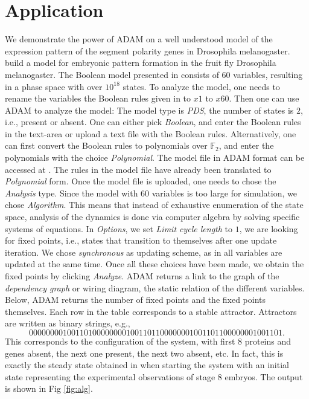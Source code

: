 \documentclass[11pt]{amsart}
\begin{document}
\section{Application} \label{benchmarks}
We demonstrate the power of ADAM on a well understood model of the expression
pattern of the segment polarity genes in Drosophila melanogaster. \cite{AO} build a model for embryonic pattern formation in the fruit fly Drosophila melanogaster. The Boolean
model presented in \cite{AO} consists of 60 variables, resulting in a phase
space with over $10^{18}$ states. To analyze the model, one needs to rename the variables the Boolean rules given in \cite{AO} to $x1$ to $x60$. Then one can use ADAM to analyze the model: The model type is {\it PDS}, the number of states is $2$, i.e., present or absent. One can either pick {\it Boolean}, and enter the Boolean rules in the text-area or upload a text file with the Boolean rules. Alternatively, one can first convert the Boolean rules to polynomials over $\mathbb F_2$, and enter the polynomials with the choice {\it Polynomial}. The model file in ADAM format can be accessed at \cite{DrosophilaModel}. The rules in the model file have already been translated to {\it Polynomial} form. Once the model file is uploaded, one needs to chose the {\it Analysis} type. Since the model with $60$ variables is too large for simulation, we chose {\it Algorithm}. This means that instead of exhaustive enumeration of the state space, analysis of the dynamics is done via computer algebra by solving specific systems of equations. In {\it Options}, we set {\it Limit cycle length} to $1$, we are looking for fixed points, i.e., states that transition to themselves after one update iteration. We chose {\it synchronous} as updating scheme, as in \cite{AO} all variables are updated at the same time. Once all these choices have been made, we obtain the fixed points by clicking {\it Analyze}.
ADAM returns a link to the graph of the {\it dependency graph} or wiring diagram, the static relation of the different variables. Below, ADAM returns the number of fixed points and the fixed points themselves. Each row in the table corresponds to a stable attractor. Attractors are written as binary strings, e.g., $$000000001001101000000001001101100000001001101100000001001101.$$ 
This corresponds to the configuration of the system, with first 8 proteins and genes absent, the next one present, the next two absent, etc. In fact, this is exactly the steady state obtained in \cite[Figure 4(b)]{AO} when starting the system with an initial state representing the experimental observations of stage 8 embryos. The output is shown in Fig \ref{fig:alg}.
\end{document}
